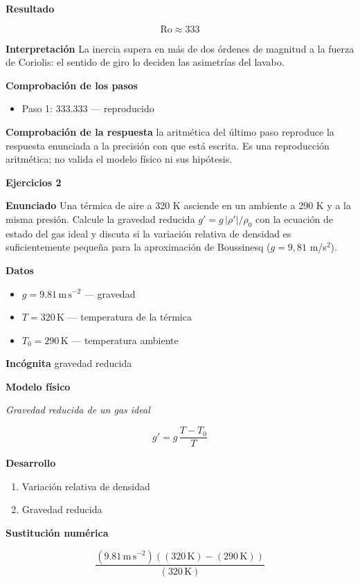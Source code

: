 \documentclass[10pt,openany]{book}
\begin{document}
\noindent\textbf{Resultado}

\[
\mathrm{Ro} \approx 333
\]

\noindent\textbf{Interpretación}
La inercia supera en más de dos órdenes de magnitud a la fuerza de Coriolis: el sentido de giro lo deciden las asimetrías del lavabo.

\noindent\textbf{Comprobación de los pasos}
\begin{itemize}
\item Paso 1: $333.333$ — reproducido
\end{itemize}

\noindent\textbf{Comprobación de la respuesta} la aritmética del último paso reproduce la respuesta enunciada a la precisión con que está escrita. Es una reproducción aritmética; no valida el modelo físico ni sus hipótesis.

\noindent\textbf{Ejercicios 2}

\noindent\textbf{Enunciado}
Una térmica de aire a 320 K asciende en un ambiente a 290 K y a la misma presión. Calcule la gravedad reducida \(g' = g\,|\rho'|/\rho_0\) con la ecuación de estado del gas ideal y discuta si la variación relativa de densidad es suficientemente pequeña para la aproximación de Boussinesq (\(g = 9{,}81\) m/s\(^2\)).

\noindent\textbf{Datos}
\begin{itemize}
\item $g = 9.81\,\mathrm{m}\,\mathrm{s}^{-2}$ — gravedad
\item $T = 320\,\mathrm{K}$ — temperatura de la térmica
\item $T_{0} = 290\,\mathrm{K}$ — temperatura ambiente
\end{itemize}

\noindent\textbf{Incógnita}
gravedad reducida

\noindent\textbf{Modelo físico}

\noindent\textit{Gravedad reducida de un gas ideal}

\[
g' = g\,\frac{T - T_0}{T}
\]

\noindent\textbf{Desarrollo}
\begin{enumerate}
\item
Variación relativa de densidad
\item
Gravedad reducida
\end{enumerate}

\noindent\textbf{Sustitución numérica}

\[
\frac{\left(9.81\,\mathrm{m}\,\mathrm{s}^{-2}\right) \left(\left(320\,\mathrm{K}\right) - \left(290\,\mathrm{K}\right)\right)}{\left(320\,\mathrm{K}\right)}
\]
\end{document}
